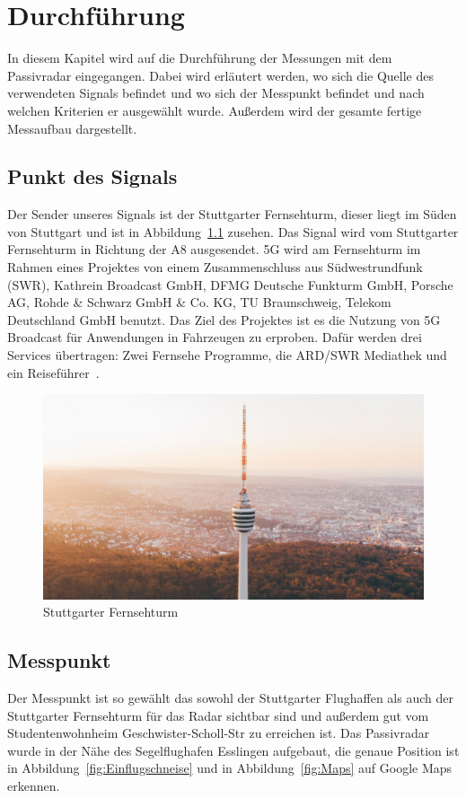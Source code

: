\chapter{Durchführung}
In diesem Kapitel wird auf die Durchführung der Messungen mit dem Passivradar eingegangen. Dabei wird erläutert werden, wo sich die Quelle des verwendeten Signals befindet und wo sich der Messpunkt befindet und nach welchen Kriterien er ausgewählt wurde. Außerdem wird der gesamte fertige Messaufbau dargestellt.
\section{Punkt des Signals}
Der Sender unseres Signals ist der Stuttgarter Fernsehturm, dieser liegt im Süden von Stuttgart und ist in Abbildung~\ref{fig:Fernsehturm} zusehen. Das Signal wird vom Stuttgarter Fernsehturm in Richtung der A8 ausgesendet. 5G wird am Fernsehturm im Rahmen eines Projektes von einem Zusammenschluss aus Südwestrundfunk (SWR), Kathrein Broadcast GmbH,  DFMG  Deutsche Funkturm GmbH, Porsche AG, Rohde \& Schwarz GmbH \& Co. KG, TU Braunschweig, Telekom Deutschland GmbH benutzt. Das Ziel des Projektes ist es die Nutzung von 5G Broadcast für Anwendungen in Fahrzeugen zu erproben. Dafür werden drei Services übertragen: Zwei Fernsehe Programme, die ARD/SWR Mediathek und ein Reiseführer~\cite{5GMAG2020}.
\begin{figure}
    \centering
    \includegraphics[width=\textwidth]{images/Fernsehturm.jpg}
    \caption{Stuttgarter Fernsehturm}\label{fig:Fernsehturm}
\end{figure}

\section{Messpunkt}
Der Messpunkt ist so gewählt das sowohl der Stuttgarter Flughaffen als auch der Stuttgarter Fernsehturm für das Radar sichtbar sind und außerdem gut vom Studentenwohnheim Geschwister-Scholl-Str zu erreichen ist. Das Passivradar wurde in der Nähe des Segelflughafen Esslingen aufgebaut, die genaue Position ist in Abbildung~\ref{fig:Einflugschneise} und in Abbildung~\ref{fig:Maps} auf Google Maps erkennen.

